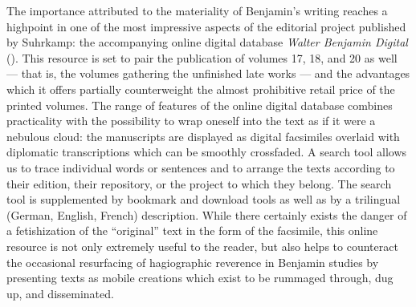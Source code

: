 \begin{review}
The importance attributed to the materiality of Benjamin's writing
reaches a highpoint in one of the most impressive aspects of the
editorial project published by Suhrkamp: the accompanying online digital
database \emph{Walter Benjamin Digital} (\citeyear{hamburger_stiftung_zur_forderung_von_wissenschaft_und_kultur_walter_2016}). This resource is set to pair
the publication of volumes 17, 18, and 20 as well --- that is, the
volumes gathering the unfinished late works --- and the advantages which
it offers partially counterweight the almost prohibitive retail price of
the printed volumes. The range of features of the online digital
database combines practicality with the possibility to wrap oneself into
the text as if it were a nebulous cloud: the manuscripts are displayed
as digital facsimiles overlaid with diplomatic transcriptions which can
be smoothly crossfaded. A search tool allows us to trace individual
words or sentences and to arrange the texts according to their edition,
their repository, or the project to which they belong. The search tool
is supplemented by bookmark and download tools as well as by a
trilingual (German, English, French) description. While there certainly
exists the danger of a fetishization of the ``original'' text in the
form of the facsimile, this online resource is not only extremely useful
to the reader, but also helps to counteract the occasional resurfacing
of hagiographic reverence in Benjamin studies by presenting texts as
mobile creations which exist to be rummaged through, dug up, and
disseminated.



\begin{flushleft}

\end{flushleft}

\end{review}